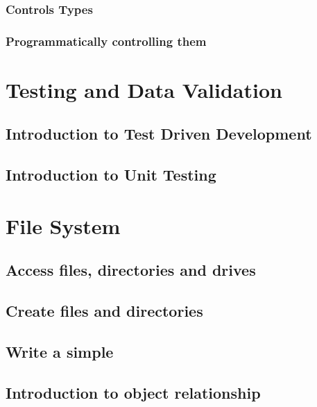 \documentclass[
]{book}
\begin{document}
\hypertarget{controls-types}{%
\subsection{Controls Types}\label{controls-types}}

\hypertarget{programmatically-controlling-them}{%
\subsection{Programmatically controlling them}\label{programmatically-controlling-them}}

\hypertarget{testing-and-data-validation}{%
\chapter{Testing and Data Validation}\label{testing-and-data-validation}}

\hypertarget{introduction-to-test-driven-development}{%
\section{Introduction to Test Driven Development}\label{introduction-to-test-driven-development}}

\hypertarget{introduction-to-unit-testing}{%
\section{Introduction to Unit Testing}\label{introduction-to-unit-testing}}

\hypertarget{file-system}{%
\chapter{File System}\label{file-system}}

\hypertarget{access-files-directories-and-drives}{%
\section{Access files, directories and drives}\label{access-files-directories-and-drives}}

\hypertarget{create-files-and-directories}{%
\section{Create files and directories}\label{create-files-and-directories}}

\hypertarget{write-a-simple}{%
\section{Write a simple}\label{write-a-simple}}

\hypertarget{introduction-to-object-relationship}{%
\section{Introduction to object relationship}\label{introduction-to-object-relationship}}

  
\end{document}
